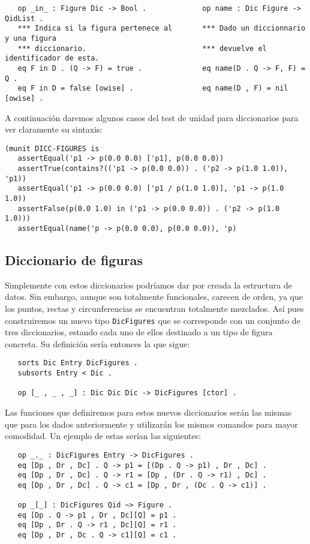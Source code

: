 {\codesize
\begin{verbatim}
   op _in_ : Figure Dic -> Bool .             op name : Dic Figure -> QidList .
   *** Indica si la figura pertenece al       *** Dado un diccionnario y una figura 
   *** diccionario.                           *** devuelve el identificador de esta.
   eq F in D . (Q -> F) = true .              eq name(D . Q -> F, F) = Q .
   eq F in D = false [owise] .                eq name(D , F) = nil [owise] . 
\end{verbatim}
}

A continuación daremos algunos casos del test de unidad para diccionarios para ver claramente su sintaxis:

{\codesize
\begin{verbatim}
(munit DICC-FIGURES is
   assertEqual('p1 -> p(0.0 0.0) ['p1], p(0.0 0.0))
   assertTrue(contains?(('p1 -> p(0.0 0.0)) . ('p2 -> p(1.0 1.0)), 'p1))
   assertEqual('p1 -> p(0.0 0.0) ['p1 / p(1.0 1.0)], 'p1 -> p(1.0 1.0))
   assertFalse(p(0.0 1.0) in ('p1 -> p(0.0 0.0)) . ('p2 -> p(1.0 1.0)))
   assertEqual(name('p -> p(0.0 0.0), p(0.0 0.0)), 'p)
\end{verbatim}
}


\subsection{Diccionario de figuras}

Simplemente con estos diccionarios podríamos dar por creada la estructura de datos. Sin embargo, aunque son totalmente funcionales, carecen de orden, ya que los puntos, rectas y circunferencias se encuentran totalmente mezclados. Así pues construiremos un nuevo tipo \texttt{DicFigures} que se corresponde con un conjunto de tres diccionarios, estando cada uno de ellos destinado a un tipo de figura concreta. Su definición sería entonces la que sigue:

{\codesize
\begin{verbatim}
   sorts Dic Entry DicFigures .
   subsorts Entry < Dic .

   op [_ , _ , _] : Dic Dic Dic -> DicFigures [ctor] .
\end{verbatim}
}

Las funciones que definiremos para estos nuevos diccionarios serán las mismas que para los dados anteriormente y utilizarán los mismos comandos para mayor comodidad. Un ejemplo de estas serían las siguientes:\par

{\codesize
\begin{verbatim}
   op _._ : DicFigures Entry -> DicFigures .
   eq [Dp , Dr , Dc] . Q -> p1 = [(Dp . Q -> p1) , Dr , Dc] .
   eq [Dp , Dr , Dc] . Q -> r1 = [Dp , (Dr . Q -> r1) , Dc] .
   eq [Dp , Dr , Dc] . Q -> c1 = [Dp , Dr , (Dc . Q -> c1)] .

   op _[_] : DicFigures Qid ~> Figure .
   eq [Dp . Q -> p1 , Dr , Dc][Q] = p1 .
   eq [Dp , Dr . Q -> r1 , Dc][Q] = r1 .
   eq [Dp , Dr , Dc . Q -> c1][Q] = c1 . 
\end{verbatim}
}

